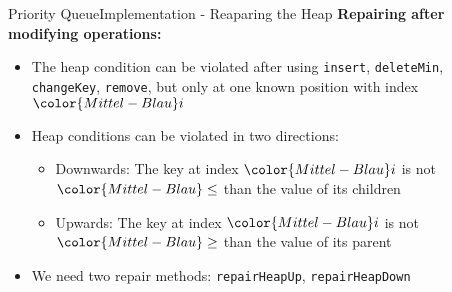 \begin{frame}{Priority Queue}{Implementation - Reaparing the Heap}
  \textbf{Repairing after modifying operations:}
  \begin{itemize}
    \item
      The heap condition can be violated after using
      {\color{Mittel-Blau}\texttt{insert}},
      {\color{Mittel-Blau}\texttt{deleteMin}},
      {\color{Mittel-Blau}\texttt{changeKey}},
      {\color{Mittel-Blau}\texttt{remove}},
      but only at one known position with index ${\color{Mittel-Blau}i}$
    \item
      Heap conditions can be violated in two directions:
      \begin{itemize}
        \item
          Downwards:
          The key at index ${\color{Mittel-Blau}i}$ is not
          ${\color{Mittel-Blau}\leq}$ than the value of its children
        \item
          Upwards:
          The key at index ${\color{Mittel-Blau}i}$ is not
          ${\color{Mittel-Blau}\geq}$ than the value of its parent
      \end{itemize}
    \item
      We need two repair methods:
      {\color{Mittel-Blau}\texttt{repairHeapUp}},
      {\color{Mittel-Blau}\texttt{repairHeapDown}}
  \end{itemize}
\end{frame}


